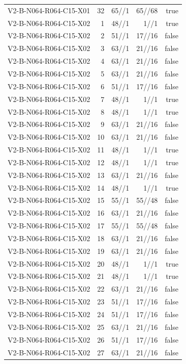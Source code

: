{\begin{longtable}{lrrrr}
V2-B-N064-R064-C15-X01 & 32 & 65//1 & 65//68 & true \\
V2-B-N064-R064-C15-X02 & 1 & 48//1 & 1//1 & true \\
V2-B-N064-R064-C15-X02 & 2 & 51//1 & 17//16 & false \\
V2-B-N064-R064-C15-X02 & 3 & 63//1 & 21//16 & false \\
V2-B-N064-R064-C15-X02 & 4 & 63//1 & 21//16 & false \\
V2-B-N064-R064-C15-X02 & 5 & 63//1 & 21//16 & false \\
V2-B-N064-R064-C15-X02 & 6 & 51//1 & 17//16 & false \\
V2-B-N064-R064-C15-X02 & 7 & 48//1 & 1//1 & true \\
V2-B-N064-R064-C15-X02 & 8 & 48//1 & 1//1 & true \\
V2-B-N064-R064-C15-X02 & 9 & 63//1 & 21//16 & false \\
V2-B-N064-R064-C15-X02 & 10 & 63//1 & 21//16 & false \\
V2-B-N064-R064-C15-X02 & 11 & 48//1 & 1//1 & true \\
V2-B-N064-R064-C15-X02 & 12 & 48//1 & 1//1 & true \\
V2-B-N064-R064-C15-X02 & 13 & 63//1 & 21//16 & false \\
V2-B-N064-R064-C15-X02 & 14 & 48//1 & 1//1 & true \\
V2-B-N064-R064-C15-X02 & 15 & 55//1 & 55//48 & false \\
V2-B-N064-R064-C15-X02 & 16 & 63//1 & 21//16 & false \\
V2-B-N064-R064-C15-X02 & 17 & 55//1 & 55//48 & false \\
V2-B-N064-R064-C15-X02 & 18 & 63//1 & 21//16 & false \\
V2-B-N064-R064-C15-X02 & 19 & 63//1 & 21//16 & false \\
V2-B-N064-R064-C15-X02 & 20 & 48//1 & 1//1 & true \\
V2-B-N064-R064-C15-X02 & 21 & 48//1 & 1//1 & true \\
V2-B-N064-R064-C15-X02 & 22 & 63//1 & 21//16 & false \\
V2-B-N064-R064-C15-X02 & 23 & 51//1 & 17//16 & false \\
V2-B-N064-R064-C15-X02 & 24 & 51//1 & 17//16 & false \\
V2-B-N064-R064-C15-X02 & 25 & 63//1 & 21//16 & false \\
V2-B-N064-R064-C15-X02 & 26 & 51//1 & 17//16 & false \\
V2-B-N064-R064-C15-X02 & 27 & 63//1 & 21//16 & false \\

\end{longtable}}
